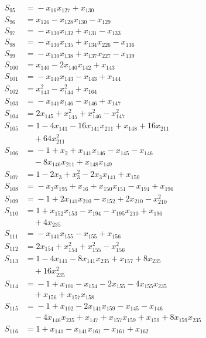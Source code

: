 \begin{align*}
S_{95} &={} -x_{16}x_{127} +x_{130} \\
S_{96} &={} x_{126} -x_{128}x_{130} -x_{129} \\
S_{97} &={} -x_{130}x_{132} +x_{131} -x_{133} \\
S_{98} &={} -x_{130}x_{135} +x_{134}x_{226} -x_{136} \\
S_{99} &={} -x_{130}x_{138} +x_{137}x_{227} -x_{139} \\
S_{100} &={} x_{140} -2x_{140}x_{142} +x_{143} \\
S_{101} &={} -x_{140}x_{143} -x_{143} +x_{144} \\
S_{102} &={} x_{143}^{2} -x_{144}^{2} +x_{164} \\
S_{103} &={} -x_{141}x_{146} -x_{146} +x_{147} \\
S_{104} &={} 2x_{145} +x_{145}^{2} +x_{146}^{2} -x_{147}^{2} \\
S_{105} &={} 1 -4x_{141} -16x_{141}x_{211} +x_{148} +16x_{211} \\
&\quad{} +64x_{211}^{2} \\
S_{106} &={} -1 +x_{2} +x_{141}x_{146} -x_{145} -x_{146} \\
&\quad{} -8x_{146}x_{211} +x_{148}x_{149} \\
S_{107} &={} 1 -2x_{3} +x_{3}^{2} -2x_{3}x_{141} +x_{150} \\
S_{108} &={} -x_{3}x_{195} +x_{16} +x_{150}x_{151} -x_{194} +x_{196} \\
S_{109} &={} -1 +2x_{141}x_{210} -x_{152} +2x_{210} -x_{210}^{2} \\
S_{110} &={} 1 +x_{152}x_{153} -x_{194} -x_{195}x_{210} +x_{196} \\
&\quad{} +4x_{235} \\
S_{111} &={} -x_{141}x_{155} -x_{155} +x_{156} \\
S_{112} &={} 2x_{154} +x_{154}^{2} +x_{155}^{2} -x_{156}^{2} \\
S_{113} &={} 1 -4x_{141} -8x_{141}x_{235} +x_{157} +8x_{235} \\
&\quad{} +16x_{235}^{2} \\
S_{114} &={} -1 +x_{101} -x_{154} -2x_{155} -4x_{155}x_{235} \\
&\quad{} +x_{156} +x_{157}x_{158} \\
S_{115} &={} -1 +x_{102} -2x_{141}x_{159} -x_{145} -x_{146} \\
&\quad{} -4x_{146}x_{235} +x_{147} +x_{157}x_{159} +x_{159} +8x_{159}x_{235} \\
S_{116} &={} 1 +x_{141} -x_{141}x_{161} -x_{161} +x_{162} \\

\end{align*}
